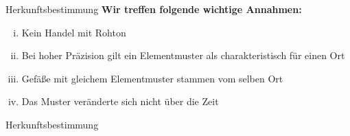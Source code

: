 \documentclass[xcolor=x11names, aspectratio=169]{beamer}
\begin{document}
\begin{frame}{Herkunftsbestimmung}
\textbf{Wir treffen folgende wichtige Annahmen:}
\begin{enumerate}[(i)]
\item Kein Handel mit Rohton
\item Bei hoher Präzision gilt ein Elementmuster als \alert{charakteristisch} für einen Ort
\item Gefäße mit gleichem Elementmuster stammen vom selben Ort
\item Das Muster veränderte sich nicht über die Zeit
\end{enumerate}
\end{frame}

\begin{frame}{Herkunftsbestimmung}
\begin{center}\Large
\begin{tabularx}{.9\columnwidth}{rlCrl}

\end{tabularx}
\end{center}
\end{frame}
\end{document}
